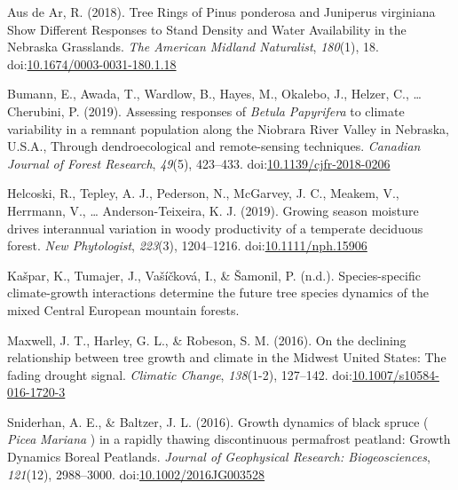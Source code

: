 \documentclass[
]{article}
\newlength{\cslhangindent}
\newenvironment{cslreferences}%
  {\setlength{\parindent}{0pt}%
  \everypar{\setlength{\hangindent}{\cslhangindent}}\ignorespaces}%
  {\par}
\begin{document}
\hypertarget{refs}{}
\begin{cslreferences}
\leavevmode\hypertarget{ref-aus_de_ar_tree_2018}{}%
Aus de Ar, R. (2018). Tree Rings of Pinus ponderosa and Juniperus
virginiana Show Different Responses to Stand Density and Water
Availability in the Nebraska Grasslands. \emph{The American Midland
Naturalist}, \emph{180}(1), 18.
doi:\href{https://doi.org/10.1674/0003-0031-180.1.18}{10.1674/0003-0031-180.1.18}

\leavevmode\hypertarget{ref-bumann_assessing_2019}{}%
Bumann, E., Awada, T., Wardlow, B., Hayes, M., Okalebo, J., Helzer, C.,
\ldots{} Cherubini, P. (2019). Assessing responses of \emph{Betula}
\emph{Papyrifera} to climate variability in a remnant population along
the Niobrara River Valley in Nebraska, U.S.A., Through dendroecological
and remote-sensing techniques. \emph{Canadian Journal of Forest
Research}, \emph{49}(5), 423--433.
doi:\href{https://doi.org/10.1139/cjfr-2018-0206}{10.1139/cjfr-2018-0206}

\leavevmode\hypertarget{ref-helcoski_growing_2019}{}%
Helcoski, R., Tepley, A. J., Pederson, N., McGarvey, J. C., Meakem, V.,
Herrmann, V., \ldots{} Anderson-Teixeira, K. J. (2019). Growing season
moisture drives interannual variation in woody productivity of a
temperate deciduous forest. \emph{New Phytologist}, \emph{223}(3),
1204--1216.
doi:\href{https://doi.org/10.1111/nph.15906}{10.1111/nph.15906}

\leavevmode\hypertarget{ref-kaspar_species-specific_nodate}{}%
Kašpar, K., Tumajer, J., Vašíčková, I., \& Šamonil, P. (n.d.).
Species-specific climate-growth interactions determine the future tree
species dynamics of the mixed Central European mountain forests.

\leavevmode\hypertarget{ref-maxwell_declining_2016}{}%
Maxwell, J. T., Harley, G. L., \& Robeson, S. M. (2016). On the
declining relationship between tree growth and climate in the Midwest
United States: The fading drought signal. \emph{Climatic Change},
\emph{138}(1-2), 127--142.
doi:\href{https://doi.org/10.1007/s10584-016-1720-3}{10.1007/s10584-016-1720-3}

\leavevmode\hypertarget{ref-sniderhan_growth_2016}{}%
Sniderhan, A. E., \& Baltzer, J. L. (2016). Growth dynamics of black
spruce ( \emph{Picea} \emph{Mariana} ) in a rapidly thawing
discontinuous permafrost peatland: Growth Dynamics Boreal Peatlands.
\emph{Journal of Geophysical Research: Biogeosciences}, \emph{121}(12),
2988--3000.
doi:\href{https://doi.org/10.1002/2016JG003528}{10.1002/2016JG003528}


\end{cslreferences}
\end{document}
